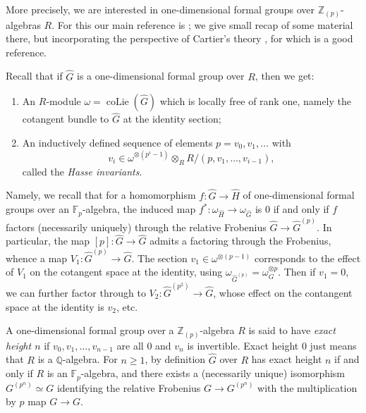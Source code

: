 \documentclass[12pt]{article}
\newcommand{\on}{\operatorname}
\begin{document}
More precisely, we are interested in one-dimensional formal groups over $\mathbb{Z}_{(p)}$-algebras $R$.  For this our main reference is \cite{GoerssMfg}; we give small recap of some material there, but incorporating the perspective of Cartier's theory \cite{CartierModules}, for which \cite{MumfordBiextensions} is a good reference.

Recall that if $\widehat{G}$ is a one-dimensional formal group over $R$, then we get:
\begin{enumerate}
\item An $R$-module $\omega=\on{coLie}(\widehat{G})$ which is locally free of rank one, namely the cotangent bundle to $\widehat{G}$ at the identity section;
\item An inductively defined sequence of elements $p=v_0,v_1,\ldots$ with
$$v_i\in \omega^{\otimes (p^i-1)}\otimes_R R/(p,v_1,\ldots, v_{i-1}),$$
called the \emph{Hasse invariants}.
\end{enumerate}

Namely, we recall that for a homomorphism $f:\widehat{G}\to\widehat{H}$ of one-dimensional formal groups over an $\mathbb{F}_p$-algebra, the induced map $f^\ast:\omega_{\widehat{H}}\to\omega_{\widehat{G}}$ is $0$ if and only if $f$ factors (necessarily uniquely) through the relative Frobenius $\widehat{G}\to\widehat{G}^{(p)}$.  In particular, the map $[p]:\widehat{G}\to\widehat{G}$ admits a factoring through the Frobenius, whence a map $V_1:\widehat{G}^{(p)}\to\widehat{G}$.  The section $v_1\in \omega^{\otimes(p-1)}$ corresponds to the effect of $V_1$ on the cotangent space at the identity, using $\omega_{\widehat{G}^{(p)}}=\omega_G^{\otimes p}$.  Then if $v_1=0$, we can further factor through to $V_2:\widehat{G}^{(p^2)}\to \widehat{G}$, whose effect on the contangent space at the identity is $v_2$, etc.

A one-dimensional formal group over a $\mathbb{Z}_{(p)}$-algebra $R$ is said to have \emph{exact height $n$} if $v_0,v_1,\ldots,v_{n-1}$ are all $0$ and $v_n$ is invertible.  Exact height $0$ just means that $R$ is a $\mathbb{Q}$-algebra.  For $n\geq 1$, by definition $\widehat{G}$ over $R$ has exact height $n$ if and only if $R$ is an $\mathbb{F}_p$-algebra, and there exists a (necessarily unique) isomorphism $G^{(p^n)}\simeq G$ identifying the relative Frobenius $G\to G^{(p^n)}$ with the multiplication by $p$ map $G\to G$.
\end{document}
